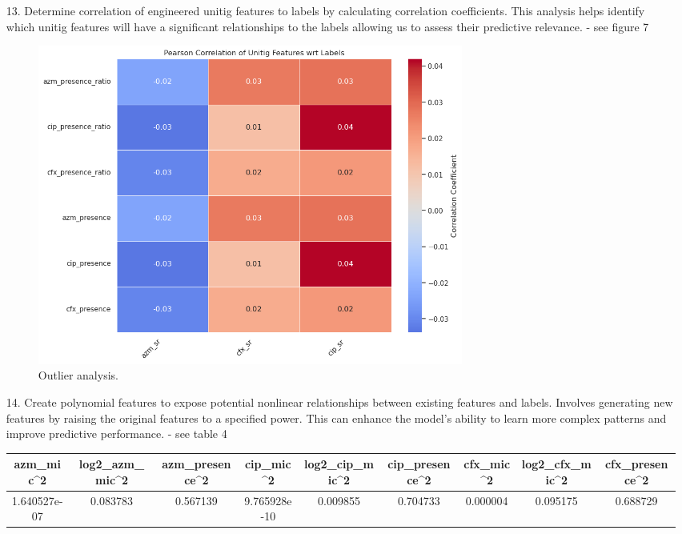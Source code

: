 \documentclass[manuscript,screen,review, nonacm]{acmart}
\begin{document}
\begin{itemize}
    \item[13.] Determine correlation of engineered unitig features to labels by calculating correlation coefficients. This analysis helps identify which unitig features will have a significant relationships to the labels allowing us to assess their predictive relevance. - see figure 7
        \begin{figure}[H]
            \centering
            \vspace{-10pt}
            \includegraphics[width=0.7\textwidth]{figures/unitig_corr.png}
            \caption{Outlier analysis.}
            \vspace{-10pt}
        \end{figure}
    \item[14.] Create polynomial features to expose potential nonlinear relationships between existing features and labels. Involves generating new features by raising the original features to a specified power. This can enhance the model's ability to learn more complex patterns and improve predictive performance. - see table 4
        \begin{table}[H]
            \centering
            \begin{tabular}{|c|c|c|c|c|c|c|c|c|}
            \hline
            \textbf{azm\_mic\^{}2} & \textbf{log2\_azm\_mic\^{}2} & \textbf{azm\_presence\^{}2} & \textbf{cip\_mic\^{}2} & \textbf{log2\_cip\_mic\^{}2} & \textbf{cip\_presence\^{}2} & \textbf{cfx\_mic\^{}2} & \textbf{log2\_cfx\_mic\^{}2} & \textbf{cfx\_presence\^{}2} \\ \hline
            1.640527e-07           & 0.083783                      & 0.567139                     & 9.765928e-10            & 0.009855                      & 0.704733                     & 0.000004                 & 0.095175                      & 0.688729                    \\ \hline

\end{tabular}
\end{table}
\end{itemize}
\end{document}
